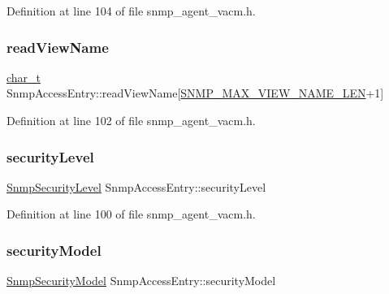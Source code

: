 Definition at line 104 of file snmp\+\_\+agent\+\_\+vacm.\+h.

\mbox{\label{structSnmpAccessEntry_aa5691126835f643e16eca03938fd7bb5}} 
\subsubsection{\texorpdfstring{read\+View\+Name}{readViewName}}
{\footnotesize\ttfamily \hyperlink{compiler__port_8h_a40bb5262bf908c328fbcfbe5d29d0201}{char\+\_\+t} Snmp\+Access\+Entry\+::read\+View\+Name\mbox{[}\hyperlink{snmp__common_8h_a8188d8ada88e9fc2c0a6d2010105b14c}{S\+N\+M\+P\+\_\+\+M\+A\+X\+\_\+\+V\+I\+E\+W\+\_\+\+N\+A\+M\+E\+\_\+\+L\+EN}+1\mbox{]}}



Definition at line 102 of file snmp\+\_\+agent\+\_\+vacm.\+h.

\mbox{\label{structSnmpAccessEntry_a46ecf3e9fa2ef86d3661de5ceb279f2a}} 
\subsubsection{\texorpdfstring{security\+Level}{securityLevel}}
{\footnotesize\ttfamily \hyperlink{snmp__agent__usm_8h_a51b89f597dc71c414d602a9195864612}{Snmp\+Security\+Level} Snmp\+Access\+Entry\+::security\+Level}



Definition at line 100 of file snmp\+\_\+agent\+\_\+vacm.\+h.

\mbox{\label{structSnmpAccessEntry_a226703910f64e584c35dece895584f8f}} 
\subsubsection{\texorpdfstring{security\+Model}{securityModel}}
{\footnotesize\ttfamily \hyperlink{snmp__agent__usm_8h_a59354ab45890b9da1b27d44f88193695}{Snmp\+Security\+Model} Snmp\+Access\+Entry\+::security\+Model}




